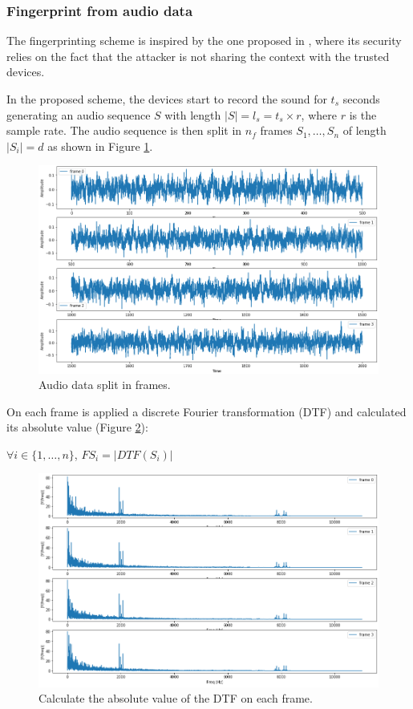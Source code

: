\subsubsection{Fingerprint from audio data}
The fingerprinting scheme is inspired by the one proposed in \cite{Schurmann2013SecureAudio}, where its security relies on the fact that the attacker is not sharing the context with the trusted devices.

In the proposed scheme, the devices start to record the sound for $t_s$ seconds generating an audio sequence $S$ with length $|S| = l_s = t_s \times r$, where $r$ is the sample rate.
The audio sequence is then split in $n_f$ frames  $S_1, \dots , S_n$ of length $|S_i| = d $ as shown in Figure \ref{fig_frames}.

\begin{figure}[!h]
\centering
\includegraphics[width=6in]{images/frames.PNG}
\caption{Audio data split in frames. }
\label{fig_frames}
\end{figure}

On each frame is applied a discrete Fourier transformation (DTF) and calculated its absolute value (Figure \ref{fig_spectrums}):
\begin{center}
    $\forall i \in \{ 1, \dots , n \}$, 
    $FS_i = |DTF(S_i)|$
\end{center}

\begin{figure}[!h]
\centering
\includegraphics[width=6in]{images/spectrums.PNG}
\caption{Calculate the absolute value of the DTF on each frame. }
\label{fig_spectrums}
\end{figure}

